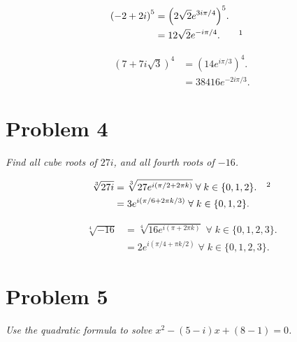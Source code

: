 \documentclass{tufte-handout}
\begin{document}
\begin{align*}
  {(-2 + 2i)}^5 &= {\left(2 \sqrt 2 e^{3 i \pi / 4} \right)}^5.\\
                &= 12 \sqrt 2 e^{-i \pi / 4}. && \footnotemark
\end{align*}

\begin{align*}
  {\left( 7 + 7 i \sqrt 3 \right)}^4 &= {\left( 14 e^{i \pi / 3}
                                       \right)}^4.\\
                                     &= 38416 e^{-2 i \pi / 3}.
\end{align*}

\section{Problem 4}

\begin{description}
\item \textit{Find all cube roots of $27i$, and all fourth roots of
    $-16$.}
\end{description}

\begin{align*}
  \sqrt[3]{27 i} &= \sqrt[3]{27 e^{i (\pi / 2 + 2 \pi k)}} \; \forall
  \; k \in \{0,1,2\}. && \footnotemark\\
                 &= 3 e^{i (\pi / 6 + 2 \pi k / 3)} \; \forall \; k
                   \in \{0,1,2\}.
\end{align*}

\begin{align*}
  \sqrt[4]{-16} &= \sqrt[4]{16e^{i(\pi + 2\pi k)}} \; \forall \; k \in \{0,1,2,3\}.\\
                &= 2e^{i(\pi / 4 + \pi k / 2)} \; \forall \; k \in \{0,1,2,3\}.
\end{align*}

\section{Problem 5}

\begin{description}
\item \textit{Use the quadratic formula to solve
    $x^2 - (5 - i)x + (8 - 1) = 0$.}
\end{description}
\end{document}
